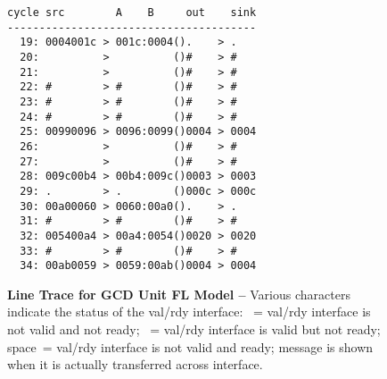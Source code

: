 
\begin{figure}

  \begin{minipage}[t]{0.5\tw}
  \footnotesize
  \begin{Verbatim}[xleftmargin=0.3in]
cycle src        A    B     out    sink
---------------------------------------
  19: 0004001c > 001c:0004().    > .
  20:          >          ()#    > #
  21:          >          ()#    > #
  22: #        > #        ()#    > #
  23: #        > #        ()#    > #
  24: #        > #        ()#    > #
  25: 00990096 > 0096:0099()0004 > 0004
  26:          >          ()#    > #
  27:          >          ()#    > #
  28: 009c00b4 > 00b4:009c()0003 > 0003
  29: .        > .        ()000c > 000c
  30: 00a00060 > 0060:00a0().    > .
  31: #        > #        ()#    > #
  32: 005400a4 > 00a4:0054()0020 > 0020
  33: #        > #        ()#    > #
  34: 00ab0059 > 0059:00ab()0004 > 0004
  \end{Verbatim}
  \end{minipage}
  \hfill
  \begin{minipage}[t]{0.47\tw}
  \caption{\textbf{Line Trace for GCD Unit FL Model --} Various
    characters indicate the status of the val/rdy interface: ~=
    val/rdy interface is not valid and not ready; \TT{\#}~= val/rdy
    interface is valid but not ready; space~= val/rdy interface is not
    valid and ready; message is shown when it is actually transferred
    across interface.}
  \label{fig-tut3-gcd-fl-linetrace}
  \end{minipage}%
  \hspace*{0.1in}\mbox{}

\end{figure}

